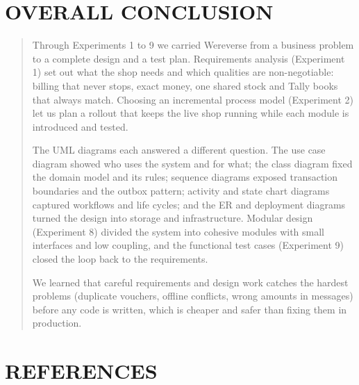 \documentclass[12pt,a4paper]{article}
\begin{document}
\clearpage
\section{OVERALL CONCLUSION}\label{overall-conclusion}

\begin{quote}
Through Experiments 1 to 9 we carried Wereverse from a business problem
to a complete design and a test plan. Requirements analysis (Experiment
1) set out what the shop needs and which qualities are non-negotiable:
billing that never stops, exact money, one shared stock and Tally books
that always match. Choosing an incremental process model (Experiment 2)
let us plan a rollout that keeps the live shop running while each module
is introduced and tested.

The UML diagrams each answered a different question. The use case
diagram showed who uses the system and for what; the class diagram fixed
the domain model and its rules; sequence diagrams exposed transaction
boundaries and the outbox pattern; activity and state chart diagrams
captured workflows and life cycles; and the ER and deployment diagrams
turned the design into storage and infrastructure. Modular design
(Experiment 8) divided the system into cohesive modules with small
interfaces and low coupling, and the functional test cases
(Experiment 9) closed the loop back to the requirements.

We learned that careful requirements and design work catches the hardest
problems (duplicate vouchers, offline conflicts, wrong amounts in
messages) before any code is written, which is cheaper and safer than
fixing them in production.
\end{quote}

\clearpage
\section{REFERENCES}\label{references}
\end{document}
